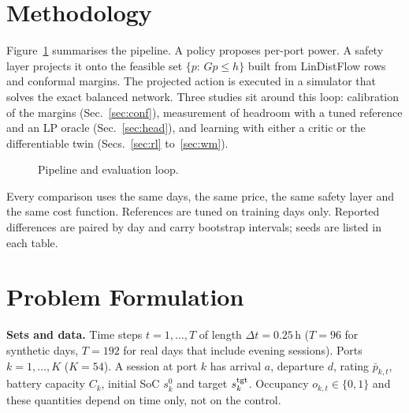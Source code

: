 \documentclass[11pt]{article}
\begin{document}
\section{Methodology}
Figure~\ref{fig:pipeline} summarises the pipeline. A policy proposes per-port power. A safety layer projects it onto the feasible set $\{p:\,Gp\le h\}$ built from LinDistFlow rows and conformal margins. The projected action is executed in a simulator that solves the exact balanced network. Three studies sit around this loop: calibration of the margins (Sec.~\ref{sec:conf}), measurement of headroom with a tuned reference and an LP oracle (Sec.~\ref{sec:head}), and learning with either a critic or the differentiable twin (Secs.~\ref{sec:rl} to~\ref{sec:wm}).
\begin{figure}[h]\centering
{}
\caption{Pipeline and evaluation loop.}\label{fig:pipeline}\end{figure}
Every comparison uses the same days, the same price, the same safety layer and the same cost function. References are tuned on training days only. Reported differences are paired by day and carry bootstrap intervals; seeds are listed in each table.

\section{Problem Formulation}\label{sec:form}
\textbf{Sets and data.} Time steps $t=1,\dots,T$ of length $\Delta t=0.25$\,h ($T=96$ for synthetic days, $T=192$ for real days that include evening sessions). Ports $k=1,\dots,K$ ($K=54$). A session at port $k$ has arrival $a$, departure $d$, rating $\bar p_{k,t}$, battery capacity $C_k$, initial SoC $s_{k}^{0}$ and target $s_k^{\rm tgt}$. Occupancy $o_{k,t}\in\{0,1\}$ and these quantities depend on time only, not on the control.
\end{document}
